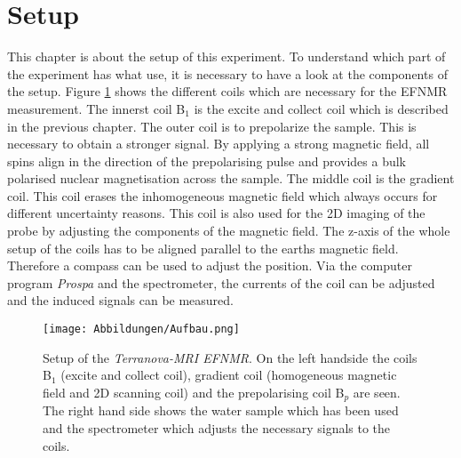 \section{Setup}
\label{sec:Aufbau}
This chapter is about the setup of this experiment. To understand which part of the experiment has what use, it is necessary to have a look at the components of the setup.\newline
Figure \ref{fig:Aufbau} shows the different coils which are necessary for the EFNMR measurement. The innerst coil B$_1$ is the excite and collect coil which is described in the previous chapter. The outer coil is to prepolarize the sample. This is necessary to obtain a stronger signal. By applying a strong magnetic field, all spins align in the direction of the prepolarising pulse and provides a bulk polarised nuclear magnetisation across the sample. The middle coil is the gradient coil. This coil erases the inhomogeneous magnetic field which always occurs for different uncertainty reasons. This coil is also used for the 2D imaging of the probe by adjusting the components of the magnetic field.\newline
The z-axis of the whole setup of the coils has to be aligned parallel to the earths magnetic field. Therefore a compass can be used to adjust the position. Via the computer program \textit{Prospa} and the spectrometer, the currents of the coil can be adjusted and the induced signals can be measured.
\begin{figure}[H]
    \centering
    \texttt{[image: Abbildungen/Aufbau.png]}   
    \caption[Setup of the \textit{Terranova-MRI EFNMR}. \cite{Bild}]{Setup of the \textit{Terranova-MRI EFNMR}. On the left handside the coils B$_1$ (excite and collect coil), gradient coil (homogeneous magnetic field and 2D scanning coil) and the prepolarising coil B$_p$ are seen. The right hand side shows the water sample which has been used and the spectrometer which adjusts the necessary signals to the coils. \cite{Bild}}
    \label{fig:Aufbau}
\end{figure}


